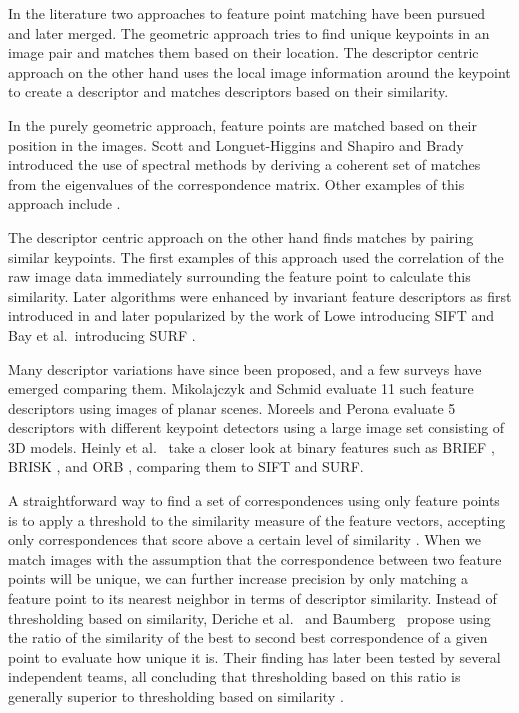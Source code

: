 \documentclass[review]{elsarticle}
\begin{document}
In the literature two approaches to feature point matching have been pursued and later merged. The geometric approach tries to find unique keypoints in an image pair and matches them based on their location.  The descriptor centric approach on the other hand uses the local image information around the keypoint to create a descriptor and matches descriptors based on their similarity.

In the purely geometric approach, feature points are matched based on their position in the images. Scott and Longuet-Higgins \cite{scott1991algorithm} and Shapiro and Brady \cite{shapiro1992feature} introduced the use of spectral methods by deriving a coherent set of matches from the eigenvalues of the correspondence matrix. Other examples of this approach include \cite{sclaroff1995modal,carcassoni2003spectral}.

The descriptor centric approach on the other hand finds matches by pairing similar keypoints. The first examples of this approach used the correlation of the raw image data immediately surrounding the feature point \cite{deriche1994robust,baumberg2000reliable} to calculate this similarity. Later algorithms were enhanced by invariant feature descriptors as first introduced in \cite{schmid1997local} and later popularized by the work of Lowe introducing SIFT \cite{lowe2004sift} and Bay et al.\ introducing SURF \cite{bay2006surf}.

Many descriptor variations have since been proposed, and a few surveys have emerged comparing them. Mikolajczyk and Schmid \cite{mikolajczyk2005performance} evaluate 11 such feature descriptors using images of planar scenes.  Moreels and Perona \cite{moreels2007evaluation} evaluate 5 descriptors with different keypoint detectors using a large image set consisting of 3D models. Heinly et al.\ \cite{heinly2012comparative} take a closer look at binary features such as BRIEF \cite{calonder2010brief}, BRISK \cite{leutenegger2011brisk}, and ORB \cite{rublee2011orb}, comparing them to SIFT and SURF. 

A straightforward way to find a set of correspondences using only feature points is to apply a threshold to the similarity measure of the feature vectors, accepting only correspondences that score above a certain level of similarity \cite{szeliski2010}. When we match images with the assumption that the correspondence between two feature points will be unique, we can further increase precision by only matching a feature point to its nearest neighbor in terms of descriptor similarity. Instead of thresholding based on similarity, Deriche et al.~\cite{deriche1994robust} and Baumberg~\cite{baumberg2000reliable} propose using the ratio of the similarity of the best to second best correspondence of a given point to evaluate how unique it is. Their finding has later been tested by several independent teams, all concluding that thresholding based on this ratio is generally superior to thresholding based on similarity \cite{lowe2004sift,mikolajczyk2005performance,moreels2007evaluation,rabin2009statistical}. 
\end{document}
